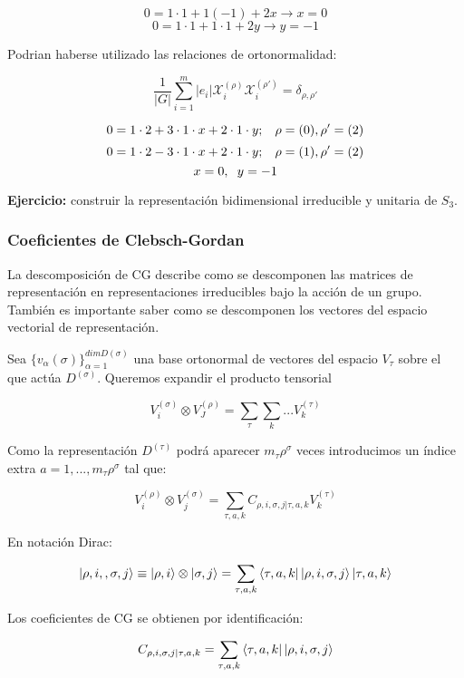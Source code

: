 \documentclass{article}
\begin{document}
\begin{itemize}
$$0=1\cdot 1+1(-1)+ 2x \to x=0$$
$$0=1\cdot 1+1\cdot 1 +2y \to y=-1$$

Podrian haberse utilizado las relaciones de ortonormalidad:

$$\frac{1}{|G|}\sum _{i=1}^m |e_i|\mathcal{X}_i^{(\rho)}\mathcal{X}_i^{(\rho ')}=\delta _{\rho , \rho '}$$

$$0=1\cdot 2+3\cdot 1\cdot x+2\cdot 1\cdot y; \hspace{0.3cm} \rho =(0), \rho '=(2)$$
$$0=1\cdot 2-3\cdot 1\cdot x +2 \cdot 1\cdot y; \hspace{0.3cm} \rho =(1),\rho '=(2)$$
$$x=0, \hspace{0.2cm} y=-1$$
\end{itemize}

\textbf{Ejercicio:} construir la representación bidimensional irreducible y unitaria de $S_3$.

\newpage

\subsubsection{Coeficientes de Clebsch-Gordan}
La descomposición de CG describe como se descomponen las matrices de representación en representaciones irreducibles bajo la acción de un grupo. También es importante saber como se descomponen los vectores del espacio vectorial de representación.

Sea $\lbrace v_\alpha (\sigma)\rbrace^{dim D(\sigma)}_{\alpha =1}$ una base ortonormal de vectores del espacio $V_\tau$ sobre el que actúa $D^{(\sigma)}$. Queremos expandir el producto tensorial

$$V_i^{(\sigma)}\otimes V_J^{(\rho)}=\sum _\tau \sum _k ...V_k^{(\tau)}$$

Como la representación $D^{(\tau)}$ podrá aparecer $m_\tau \rho ^\sigma$ veces introducimos un índice extra $a=1,..., m_\tau \rho ^\sigma$ tal que:

$$V_i^{(\rho)}\otimes V_j^{(\sigma)}=\sum _{\tau , a, k}C_{\rho , i, \sigma, j | \tau, a, k}V_k^{(\tau)}$$

En notación Dirac:

$$\ket{\rho, i, ,\sigma , j}\equiv \ket{\rho, i} \otimes \ket{\sigma , j}=\sum _{\tau , a,k}\bra{\tau , a, k}\ket{\rho, i,  \sigma ,j } \ket{\tau , a, k}$$

Los coeficientes de CG se obtienen por identificación:

$$C_{\rho , i, \sigma, j | \tau, a, k}=\sum_{\tau , a,k}\bra{\tau , a, k}\ket{\rho, i,  \sigma ,j } $$
\end{document}
